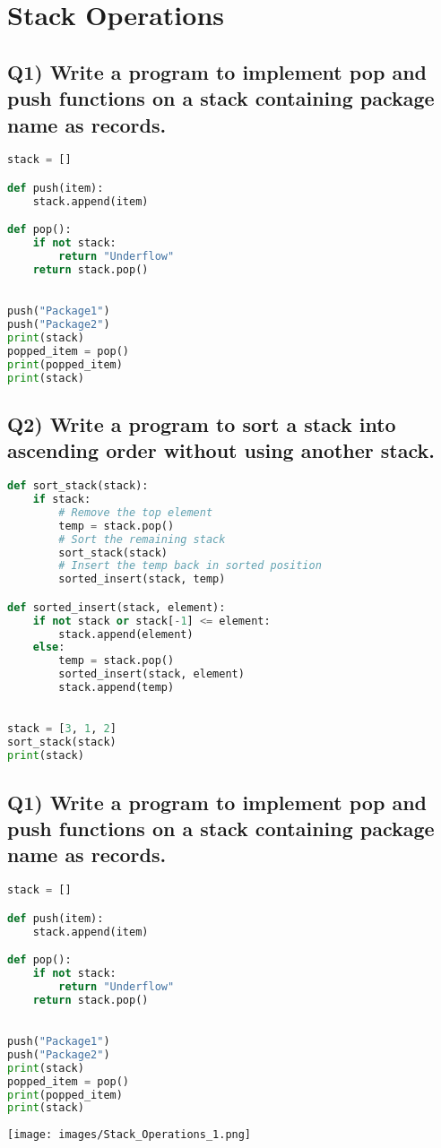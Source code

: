 \documentclass{article}
\begin{document}
\section{Stack Operations}

\subsection*{Q1) Write a program to implement pop and push functions on a stack containing package name as records.}
\begin{lstlisting}[language=Python]
stack = []

def push(item):
    stack.append(item)

def pop():
    if not stack:
        return "Underflow"
    return stack.pop()

 
push("Package1")
push("Package2")
print(stack)
popped_item = pop()
print(popped_item)
print(stack)
\end{lstlisting}

\subsection*{Q2) Write a program to sort a stack into ascending order without using another stack.}
\begin{lstlisting}[language=Python]
def sort_stack(stack):
    if stack:
        # Remove the top element
        temp = stack.pop()
        # Sort the remaining stack
        sort_stack(stack)
        # Insert the temp back in sorted position
        sorted_insert(stack, temp)

def sorted_insert(stack, element):
    if not stack or stack[-1] <= element:
        stack.append(element)
    else:
        temp = stack.pop()
        sorted_insert(stack, element)
        stack.append(temp)

 
stack = [3, 1, 2]
sort_stack(stack)
print(stack)
\end{lstlisting}

\subsection*{Q1) Write a program to implement pop and push functions on a stack containing package name as records.}
\begin{lstlisting}[language=Python]
stack = []

def push(item):
    stack.append(item)

def pop():
    if not stack:
        return "Underflow"
    return stack.pop()

 
push("Package1")
push("Package2")
print(stack)
popped_item = pop()
print(popped_item)
print(stack)
\end{lstlisting}
\texttt{[image: images/Stack\_Operations\_1.png]}
\end{document}
